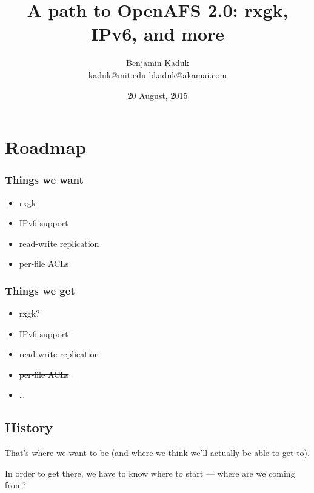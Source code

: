 \documentclass{beamer}
\title{A path to OpenAFS 2.0: rxgk, IPv6, and more}
\author{Benjamin Kaduk \\ \url{kaduk@mit.edu} \url{bkaduk@akamai.com}}
\date{20 August, 2015}
\begin{document}
\AtBeginSection[]
{
    \begin{frame}
	\tableofcontents[currentsection]
    \end{frame}
}

\frame{\titlepage}

\section{Roadmap}

\begin{frame}[fragile]
\frametitle{Things we want}
\begin{itemize}
\item{rxgk\hphantom{?}}
\item{IPv6 support}
\item{read-write replication}
\item{per-file ACLs}
\end{itemize}
\end{frame}

\begin{frame}
\frametitle{Things we get}
\begin{itemize}
\item{rxgk?}
\pause
\item{\sout{IPv6 support}}
\pause
\item{\sout{read-write replication}}
\pause
\item{\sout{per-file ACLs}}
\pause
\item{\ldots}
\end{itemize}
\end{frame}

\subsection{History}

\begin{frame}
That's where we want to be (and where we think we'll actually be able to
get to).

\vspace{1em}
In order to get there, we have to know where to start --- where are we
coming from?
\end{frame}
\end{document}

